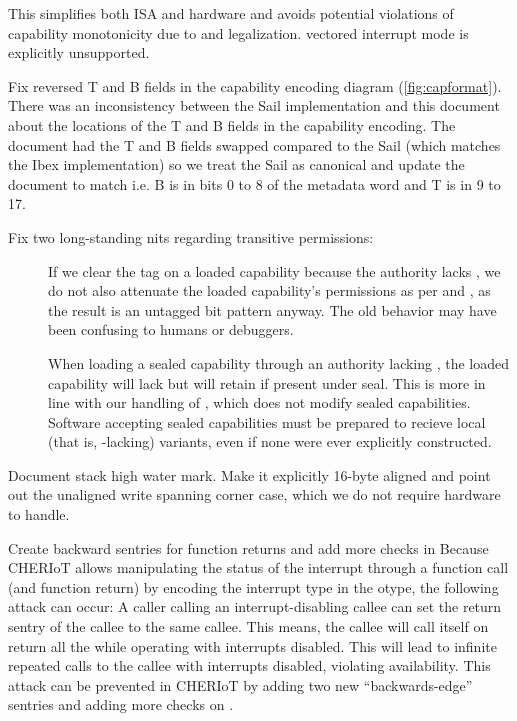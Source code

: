 \begin{description}
\begin{description}
    This simplifies both ISA and hardware and avoids potential violations of capability monotonicity due to  and  legalization.
    vectored interrupt mode is explicitly unsupported.
    \item[\ghpr{38}] Fix reversed T and B fields in the capability encoding diagram (\cref{fig:capformat}).
    There was an inconsistency between the Sail implementation and this document about the locations of the T and B fields in the capability encoding.
    The document had the T and B fields swapped compared to the Sail (which matches the Ibex implementation) so we treat the Sail as canonical and update the document to match i.e. B is in bits 0 to 8 of the metadata word and T is in 9 to 17.
    \item[\ghpr{44}] Fix two long-standing nits regarding transitive permissions:
      \begin{description}
        \item[] If we clear the tag on a loaded capability because the authority lacks \cappermMC,
          we do not also attenuate the loaded capability's permissions as per \cappermILG and \cappermLM,
          as the result is an untagged bit pattern anyway.
          The old behavior may have been confusing to humans or debuggers.
        \item[] When loading a sealed capability through an authority lacking \cappermILG,
          the loaded capability will lack \cappermG but will retain \cappermILG if present under seal.
          This is more in line with our handling of \cappermLM, which does not modify sealed capabilities.
          Software accepting sealed capabilities must be prepared to recieve local (that is, \cappermG-lacking) variants,
          even if none were ever explicitly constructed.
      \end{description}
    \item[\ghissue{15}, \ghpr{49}] Document stack high water mark.
    Make it explicitly 16-byte aligned and point out the unaligned write spanning \mshwmb{} corner case, which we do not require hardware to handle.
    \item[\ghpr{54}] Create backward sentries for function returns and add more checks in 
    Because CHERIoT allows manipulating the status of the interrupt through a function call (and function return) by encoding the interrupt type in the otype, the following attack can occur: A caller calling an interrupt-disabling callee can set the return sentry of the callee to the same callee. This means, the callee will call itself on return all the while operating with interrupts disabled. This will lead to infinite repeated calls to the callee with interrupts disabled, violating availability. This attack can be prevented in CHERIoT by adding two new ``backwards-edge'' sentries and adding more checks on .

\end{description}
\end{description}

